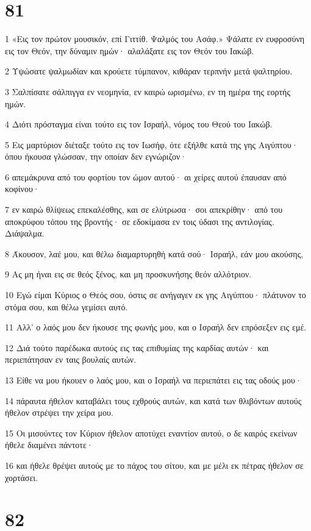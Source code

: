 \chapter{81}

\par 1 «Εις τον πρώτον μουσικόν, επί Γιττίθ. Ψαλμός του Ασάφ.» Ψάλατε εν ευφροσύνη εις τον Θεόν, την δύναμιν ημών· αλαλάξατε εις τον Θεόν του Ιακώβ.
\par 2 Υψώσατε ψαλμωδίαν και κρούετε τύμπανον, κιθάραν τερπνήν μετά ψαλτηρίου.
\par 3 Σαλπίσατε σάλπιγγα εν νεομηνία, εν καιρώ ωρισμένω, εν τη ημέρα της εορτής ημών.
\par 4 Διότι πρόσταγμα είναι τούτο εις τον Ισραήλ, νόμος του Θεού του Ιακώβ.
\par 5 Εις μαρτύριον διέταξε τούτο εις τον Ιωσήφ, ότε εξήλθε κατά της γης Αιγύπτου· όπου ήκουσα γλώσσαν, την οποίαν δεν εγνώριζον·
\par 6 απεμάκρυνα από του φορτίου τον ώμον αυτού· αι χείρες αυτού έπαυσαν από κοφίνου·
\par 7 εν καιρώ θλίψεως επεκαλέσθης, και σε ελύτρωσα· σοι απεκρίθην· από του αποκρύφου τόπου της βροντής· σε εδοκίμασα εν τοις ύδασι της αντιλογίας. Διάψαλμα.
\par 8 Άκουσον, λαέ μου, και θέλω διαμαρτυρηθή κατά σού· Ισραήλ, εάν μου ακούσης,
\par 9 Ας μη ήναι εις σε θεός ξένος, και μη προσκυνήσης θεόν αλλότριον.
\par 10 Εγώ είμαι Κύριος ο Θεός σου, όστις σε ανήγαγεν εκ γης Αιγύπτου· πλάτυνον το στόμα σου, και θέλω γεμίσει αυτό.
\par 11 Αλλ' ο λαός μου δεν ήκουσε της φωνής μου, και ο Ισραήλ δεν επρόσεξεν εις εμέ.
\par 12 Διά τούτο παρέδωκα αυτούς εις τας επιθυμίας της καρδίας αυτών· και περιεπάτησαν εν ταις βουλαίς αυτών.
\par 13 Είθε να μου ήκουεν ο λαός μου, και ο Ισραήλ να περιεπάτει εις τας οδούς μου·
\par 14 πάραυτα ήθελον καταβάλει τους εχθρούς αυτών, και κατά των θλιβόντων αυτούς ήθελον στρέψει την χείρα μου.
\par 15 Οι μισούντες τον Κύριον ήθελον αποτύχει εναντίον αυτού, ο δε καιρός εκείνων ήθελε διαμένει πάντοτε·
\par 16 και ήθελε θρέψει αυτούς με το πάχος του σίτου, και με μέλι εκ πέτρας ήθελον σε χορτάσει.

\chapter{82}

